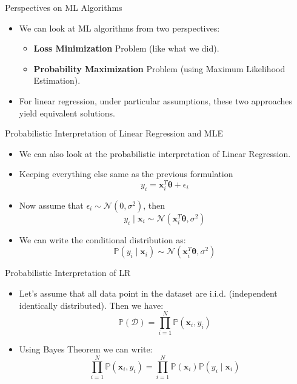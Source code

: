 \begin{frame}{Perspectives on ML Algorithms}

\begin{itemize}
    \item We can look at ML algorithms from two perspectives:
    \begin{itemize}
        \item \textbf{Loss Minimization} Problem (like what we did).
        \item \textbf{Probability Maximization} Problem (using Maximum Likelihood Estimation).
    \end{itemize}
    
    \item For linear regression, under particular assumptions, these two approaches yield equivalent solutions.
\end{itemize}

\end{frame}


\begin{frame}{Probabilistic Interpretation of Linear Regression and MLE}

\begin{itemize}
    \item We can also look at the probabilistic interpretation of Linear Regression.
    \item Keeping everything else same as the previous formulation
\[
y_i = \mathbf{x}_i^T \boldsymbol{\theta} + \epsilon_i
\]
    \item Now assume that $\epsilon_i \sim \mathcal{N}(0, \sigma^2)$, then 
\[
y_i \mid \mathbf{x}_i \sim \mathcal{N}(\mathbf{x}_i^T \boldsymbol{\theta}, \sigma^2)
\]
    \item We can write the conditional distribution as:
\[
\mathbb{P}(y_i \mid \mathbf{x}_i) \sim \mathcal{N}(\mathbf{x}_i^T \boldsymbol{\theta}, \sigma^2)
\]
\end{itemize}

\end{frame}


\begin{frame}{Probabilistic Interpretation of LR}

\begin{itemize}
    \item Let’s assume that all data point in the dataset are i.i.d. (independent identically distributed). Then we have:
\[
\mathbb{P}(\mathcal{D}) = \prod_{i=1}^{N} \mathbb{P}(\mathbf{x}_i, y_i)
\]

    \item Using Bayes Theorem we can write:
\[
\prod_{i=1}^{N} \mathbb{P}(\mathbf{x}_i, y_i) = \prod_{i=1}^{N} \mathbb{P}(\mathbf{x}_i) \mathbb{P}(y_i \mid \mathbf{x}_i)
\]
\end{itemize}

\end{frame}


